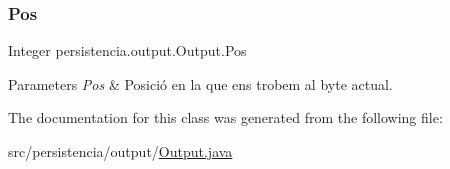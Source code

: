 \subsubsection{\texorpdfstring{Pos}{Pos}}
{\footnotesize\ttfamily Integer persistencia.\+output.\+Output.\+Pos\hspace{0.3cm}{\ttfamily [package]}}


\begin{DoxyParams}{Parameters}
{\em Pos} & Posició en la que ens trobem al byte actual. \\
\hline
\end{DoxyParams}


The documentation for this class was generated from the following file\+:\begin{DoxyCompactItemize}
\item 
src/persistencia/output/\hyperlink{Output_8java}{Output.\+java}\end{DoxyCompactItemize}

